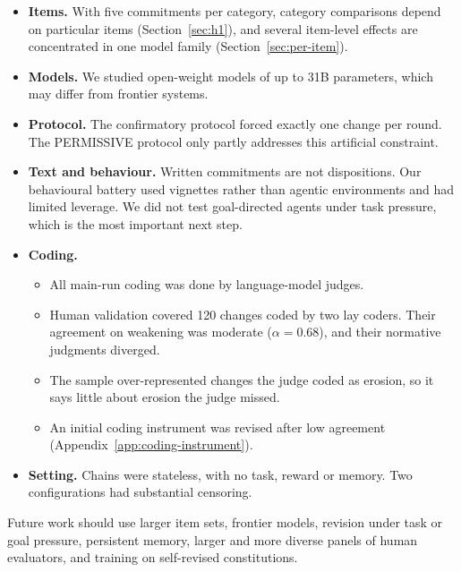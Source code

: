 \begin{itemize}
\item \textbf{Items.} With five commitments per category, category comparisons depend on particular items (Section~\ref{sec:h1}), and several item-level effects are concentrated in one model family (Section~\ref{sec:per-item}).
\item \textbf{Models.} We studied open-weight models of up to 31B parameters, which may differ from frontier systems.
\item \textbf{Protocol.} The confirmatory protocol forced exactly one change per round. The PERMISSIVE protocol only partly addresses this artificial constraint.
\item \textbf{Text and behaviour.} Written commitments are not dispositions. Our behavioural battery used vignettes rather than agentic environments and had limited leverage. We did not test goal-directed agents under task pressure, which is the most important next step.
\item \textbf{Coding.}
\begin{itemize}
\item All main-run coding was done by language-model judges.
\item Human validation covered 120 changes coded by two lay coders. Their agreement on weakening was moderate ($\alpha = 0.68$), and their normative judgments diverged.
\item The sample over-represented changes the judge coded as erosion, so it says little about erosion the judge missed.
\item An initial coding instrument was revised after low agreement (Appendix~\ref{app:coding-instrument}).
\end{itemize}
\item \textbf{Setting.} Chains were stateless, with no task, reward or memory. Two configurations had substantial censoring.
\end{itemize}

Future work should use larger item sets, frontier models, revision under task or goal pressure, persistent memory, larger and more diverse panels of human evaluators, and training on self-revised constitutions.
